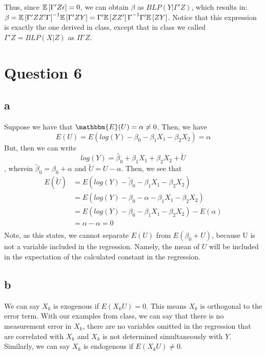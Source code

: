 \documentclass[12pt]{paper}
\begin{document}
Thus, since $\mathbb{E} \left [ \Gamma'Z\epsilon \right ]=0$, we can obtain $\beta$ as $BLP(Y|\Gamma'Z)$, which results in: $\beta={\mathbb{E} \left [ \Gamma'ZZ'\Gamma \right ]}^{-1}\mathbb{E} \left [ \Gamma'ZY \right ]={\Gamma'\mathbb{E} \left [ ZZ' \right ]\Gamma}^{-1}\Gamma'\mathbb{E} \left [ ZY \right ]$. Notice that this expression is exactly the one derived in class, except that in class we called $\Gamma'Z=BLP(X|Z)$ as $\Pi'Z$.

\section*{Question 6}

\subsection*{a} Suppose we have that $\mathbbm{E}(U) = \alpha\neq 0$. Then, we have 
$$E(U) = E(log(Y) - \beta_0 - \beta_1 X_1- \beta_2 X_2) = \alpha$$
But, then we can write $$log(Y) = \tilde{\beta_0} + \beta_1 X_1 + \beta_2X_2 + \tilde U$$, wherein $\tilde \beta_0 = \beta_0+ \alpha$ and $\tilde U = U - \alpha$. Then, we see that 
\begin{align*}
E (\tilde U) & = E(log(Y) - \tilde \beta_0 - \beta_1 X_1 - \beta_2 X_2) \\
 & = E(log(Y) - \beta_0 - \alpha - \beta_1 X_1 - \beta_2 X_2) \\
 & = E(log(Y) - \beta_0  - \beta_1 X_1 - \beta_2 X_2) - E(\alpha) \\
 & = \alpha - \alpha = 0 \\
\end{align*}
Note, as this states, we cannot separate $E(U)$ from $E(\beta_0 + U)$, because U is not a variable included in the regression. Namely, the mean of $U$ will be included in the expectation of the calculated constant in the regression. \\

\subsection*{b} We can say $X_k$ is exogenous if $E(X_k U) = 0$. This means $X_k$ is orthogonal to the error term. With our examples from class, we can say that there is no measurement error in $X_k$, there are no variables omitted in the regression that are correlated with $X_k$ and $X_k$ is not determined simultaneously with $Y$.  \\

Similarly, we can say $X_k$ is endogenous if $E(X_k U) \neq 0$. \\
\end{document}
